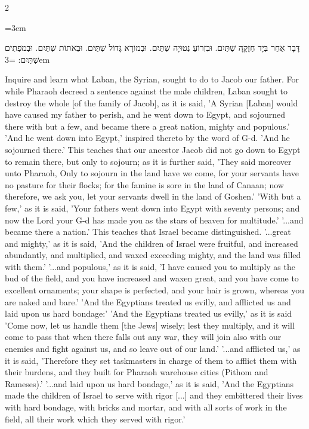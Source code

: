 \documentclass[11pt, openany]{book}
\newenvironment{bilingual}{%
  \par\vspace{4pt}%
  \begin{paracol}{2}%
}{%
  \end{paracol}%
  \par\vspace{2pt}%
}
\newenvironment{hebrewcol}{%
  \switchcolumn[1]%
  \begingroup
  \RTL
  \hebrewfont\large
  \setstretch{1.4}%
  \emergencystretch=3em
  \tolerance=9999
  \parindent=0pt\relax
}{%
  \endRTL
  \endgroup
}
\newenvironment{englishcol}{%
  \switchcolumn[0]%
  \begingroup
  \setstretch{1.4}%
  \emergencystretch=3em
  \tolerance=9999
  \normalsize
  \rightskip=0.12in\relax
}{%
  \endgroup
}
\begin{document}
\begin{bilingual}
\begin{hebrewcol}
דָּבָר אַחֵר בְּיָד חַזָקָָה שְׁתַּיִם. וּבִזְרוֹעַ נְטוּיָה שְׁתַּיִם. וּבְמוֹרָא גָּדוֹל שְׁתַּיִם. וּבְאֹתוֹת שְׁתַּיִם. וּבְמֹפְתִים שְׁתַּיִם:
\end{hebrewcol}
\begin{englishcol}
Inquire and learn what Laban, the Syrian, sought to do to Jacob our father. For while Pharaoh decreed a sentence against the male children, Laban sought to destroy the whole [of the family of Jacob], as it is said, 'A Syrian [Laban] would have caused my father to perish, and he went down to Egypt, and sojourned there with but a few, and became there a great nation, mighty and populous.'
'And he went down into Egypt,' inspired thereto by the word of G-d. 'And he sojourned there.' This teaches that our ancestor Jacob did not go down to Egypt to remain there, but only to sojourn; as it is further said, 'They said moreover unto Pharaoh, Only to sojourn in the land have we come, for your servants have no pasture for their flocks; for the famine is sore in the land of Canaan; now therefore, we ask you, let your servants dwell in the land of Goshen.'
'With but a few,' as it is said, 'Your fathers went down into Egypt with seventy persons; and now the Lord your G-d has made you as the stars of heaven for multitude.'
'...and became there a nation.' This teaches that Israel became distinguished. '...great and mighty,' as it is said, 'And the children of Israel were fruitful, and increased abundantly, and multiplied, and waxed exceeding mighty, and the land was filled with them.' '...and populous,' as it is said, 'I have caused you to multiply as the bud of the field, and you have increased and waxen great, and you have come to excellent ornaments; your shape is perfected, and your hair is grown, whereas you are naked and bare.'
'And the Egyptians treated us evilly, and  afflicted us and laid upon us hard bondage:' 'And the Egyptians treated us evilly,' as it is said 'Come now, let us handle them [the Jews] wisely; lest they multiply, and it will come to pass that when there falls out any war, they will join also with our enemies and fight against us, and so leave out of our land.' '...and afflicted us,' as it is said, 'Therefore they set taskmasters in charge of them to afflict them with their burdens,  and they built for Pharaoh warehouse cities (Pithom and Rameses).' '...and laid upon us hard bondage,' as it is said, 'And the Egyptians made the children of Israel to serve with rigor [...] and they embittered their lives with hard bondage, with bricks and mortar, and with all sorts of work in the field, all their work which they served with rigor.'

\end{englishcol}
\end{bilingual}
\end{document}
